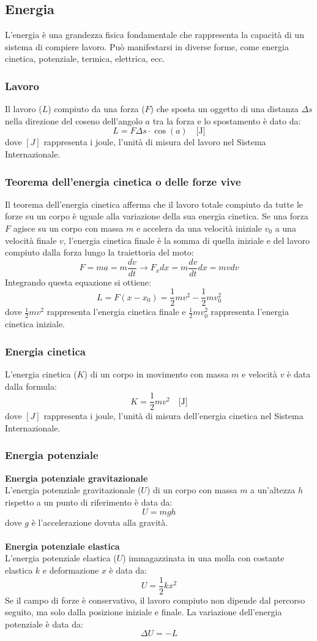 \documentclass{article}
\begin{document}
\subsection{Energia}
L'energia è una grandezza fisica fondamentale che rappresenta la capacità di un sistema di compiere lavoro. Può manifestarsi in diverse forme, come energia cinetica, potenziale, termica, elettrica, ecc.
\subsubsection{Lavoro}
Il lavoro (\(L\)) compiuto da una forza (\(F\)) che sposta un oggetto di una distanza \(\Delta s\) nella direzione del coseno dell'angolo \(a\) tra la forza e lo spostamento è dato da:
\[
L = F\Delta s \cdot \cos(a) \quad \text{[J]}
\]
dove \([J]\) rappresenta i joule, l'unità di misura del lavoro nel Sistema Internazionale.
\subsubsection{Teorema dell'energia cinetica o delle forze vive}
Il teorema dell'energia cinetica afferma che il lavoro totale compiuto da tutte le forze su un corpo è uguale alla variazione della sua energia cinetica. Se una forza \(F\) agisce su un corpo con massa \(m\) e accelera da una velocità iniziale \(v_0\) a una velocità finale \(v\), l'energia cinetica finale è la somma di quella iniziale e del lavoro compiuto dalla forza lungo la traiettoria del moto:
\[
F = ma = m\frac{dv}{dt} \rightarrow F_x dx = m \frac{dv}{dt} dx = mv dv
\]
Integrando questa equazione si ottiene:
\[
L = F(x - x_0) = \frac{1}{2}mv^2 - \frac{1}{2}mv_0^2
\]
dove \(\frac{1}{2}mv^2\) rappresenta l'energia cinetica finale e \(\frac{1}{2}mv_0^2\) rappresenta l'energia cinetica iniziale.
\subsubsection{Energia cinetica}
L'energia cinetica (\(K\)) di un corpo in movimento con massa \(m\) e velocità \(v\) è data dalla formula:
\[
K = \frac{1}{2}mv^2 \quad \text{[J]}
\]
dove \([J]\) rappresenta i joule, l'unità di misura dell'energia cinetica nel Sistema Internazionale.
\subsubsection{Energia potenziale}
\textbf{Energia potenziale gravitazionale}\\
L'energia potenziale gravitazionale (\(U\)) di un corpo con massa \(m\) a un'altezza \(h\) rispetto a un punto di riferimento è data da:
\[
U = mgh
\]
dove \(g\) è l'accelerazione dovuta alla gravità.\\
\\
\textbf{Energia potenziale elastica}\\
L'energia potenziale elastica (\(U\)) immagazzinata in una molla con costante elastica \(k\) e deformazione \(x\) è data da:
\[
U = \frac{1}{2}kx^2
\]
Se il campo di forze è conservativo, il lavoro compiuto non dipende dal percorso seguito, ma solo dalla posizione iniziale e finale. La variazione dell'energia potenziale è data da:
\[
\Delta U = -L
\]
\end{document}
